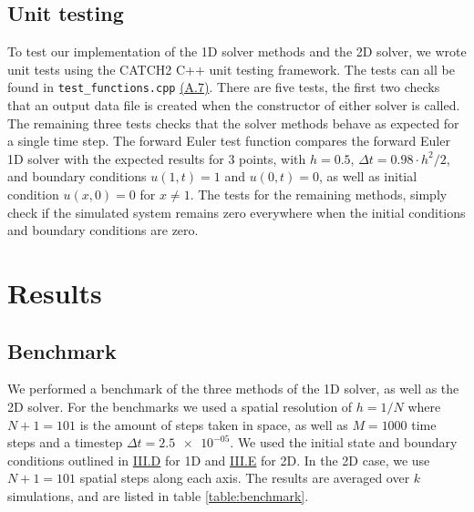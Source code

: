 \documentclass[reprint,english,notitlepage]{revtex4-1}  %
\begin{document}
\subsection{Unit testing} \label{sec:method_unit_testing}

To test our implementation of the 1D solver methods and the 2D solver, we wrote unit tests using the CATCH2 C++ unit testing framework. The tests can all be found in \verb+test_functions.cpp+ \hyperref[A.7]{(A.7)}. There are five tests, the first two checks that an output data file is created when the constructor of either solver is called. The remaining three tests checks that the solver methods behave as expected for a single time step. The forward Euler test function compares the forward Euler 1D solver with the expected results for \(3\) points, with \(h=0.5\), \(\Delta t = 0.98\cdot h^{2}/2\), and boundary conditions \(u(1, t) = 1\) and \(u(0, t) = 0\), as well as initial condition \(u(x, 0) = 0\) for \(x \neq 1\). The tests for the remaining methods, simply check if the simulated system remains zero everywhere when the initial conditions and boundary conditions are zero.







 
\clearpage

\section{Results} \label{sec:results}

\subsection{Benchmark} \label{sec:results_benchmark}
We performed a benchmark of the three methods of the 1D solver, as well as the 2D solver. For the benchmarks we used a spatial resolution of \( h = 1/N\) where \(N+1 = 101\) is the amount of steps taken in space, as well as \(M = 1000\) time steps and a timestep \(\Delta t = \num{2.5e-05}\). We used the initial state and boundary conditions outlined in \hyperref[sec:method_1D_sims]{III.D} for 1D and \hyperref[sec:method_2D_sim]{III.E} for 2D. In the 2D case, we use \(N+1=101\) spatial steps along each axis. The results are averaged over \(k\) simulations, and are listed in table \ref{table:benchmark}.
\end{document}
